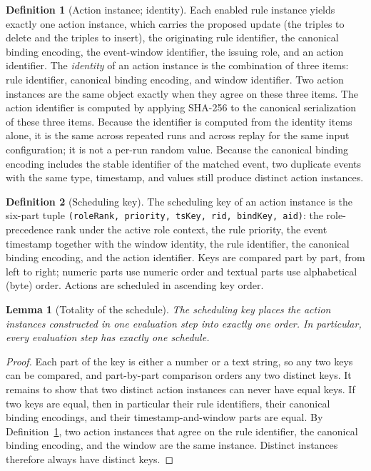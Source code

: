 \documentclass{ieeeaccess}
\theoremstyle{definition}
\newtheorem{definition}{Definition}
\theoremstyle{plain}
\newtheorem{lemma}{Lemma}
\theoremstyle{remark}
\begin{document}
\begin{definition}[Action instance; identity]
\label{def:action}
Each enabled rule instance yields exactly one action instance, which carries the proposed update (the triples to delete and the triples to insert), the originating rule identifier, the canonical binding encoding, the event-window identifier, the issuing role, and an action identifier. The \emph{identity} of an action instance is the combination of three items: rule identifier, canonical binding encoding, and window identifier. Two action instances are the same object exactly when they agree on these three items. The action identifier is computed by applying SHA-256 to the canonical serialization of these three items. Because the identifier is computed from the identity items alone, it is the same across repeated runs and across replay for the same input configuration; it is not a per-run random value. Because the canonical binding encoding includes the stable identifier of the matched event, two duplicate events with the same type, timestamp, and values still produce distinct action instances.
\end{definition}

\begin{definition}[Scheduling key]
\label{def:key}
The scheduling key of an action instance is the six-part tuple \texttt{(roleRank, priority, tsKey, rid, bindKey, aid)}: the role-precedence rank under the active role context, the rule priority, the event timestamp together with the window identity, the rule identifier, the canonical binding encoding, and the action identifier. Keys are compared part by part, from left to right; numeric parts use numeric order and textual parts use alphabetical (byte) order. Actions are scheduled in ascending key order.
\end{definition}

\begin{lemma}[Totality of the schedule]
\label{lem:total}
The scheduling key places the action instances constructed in one evaluation step into exactly one order. In particular, every evaluation step has exactly one schedule.
\end{lemma}
\begin{proof}
Each part of the key is either a number or a text string, so any two keys can be compared, and part-by-part comparison orders any two distinct keys. It remains to show that two distinct action instances can never have equal keys. If two keys are equal, then in particular their rule identifiers, their canonical binding encodings, and their timestamp-and-window parts are equal. By Definition~\ref{def:action}, two action instances that agree on the rule identifier, the canonical binding encoding, and the window are the same instance. Distinct instances therefore always have distinct keys.
\end{proof}
\end{document}
